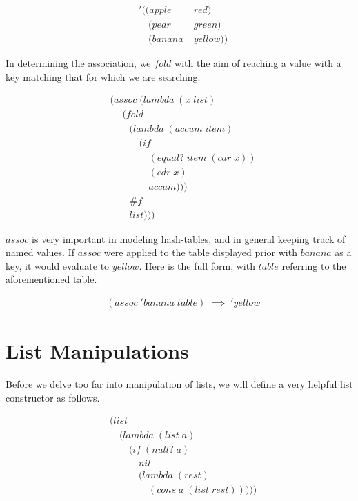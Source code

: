 \begin{figure}[htp]
\footnotesize
\caption{}\label{fig:hashExample}
\begin{align*}
& '((apple \; &red)
\\& \quad (pear \; &green)
\\& \quad (banana \; &yellow))
\end{align*}
\end{figure}

In determining the association, we $fold$ with the aim of reaching a value with a 
key matching that for which we are searching.

\begin{figure}[htp]
\footnotesize
\caption{}\label{fig:assocDef}
\begin{align*}
& (assoc \; (lambda \; (x \; list)
\\& \quad \; (fold \; 
\\& \qquad (lambda \; (accum \; item) \; 
\\& \qquad \quad (if \; 
\\& \qquad \qquad (equal? \; item \; (car \; x))
\\& \qquad \qquad (cdr \; x)
\\& \qquad \qquad accum)))
\\& \qquad \#f
\\& \qquad list)))
\end{align*}
\end{figure}

$assoc$ is very important in modeling hash-tables, and in general keeping track of 
named values. If $assoc$ were applied to the table displayed prior with $banana$ 
as a key, it would evaluate to $yellow$. Here is the full form, with $table$ 
referring to the aforementioned table.

\begin{figure}[htp]
\footnotesize
\caption{}\label{fig:assocExample}
\begin{align*}
& (assoc \; 'banana \; table) \; \implies \; 'yellow
\end{align*}
\end{figure}

\section{List Manipulations}
Before we delve too far into manipulation of lists, we will define a very helpful 
list constructor as follows.

\begin{figure}[htp]
\footnotesize
\caption{}\label{fig:listDef}
\begin{align*}
& (list \; 
\\& \quad (lambda \; (list \; a) \; 
\\& \qquad (if \; (null? \; a)
\\& \qquad \quad nil
\\& \qquad \quad (lambda \; (rest)
\\& \qquad \qquad (cons \; a \; (list \; rest)))))
\end{align*}
\end{figure}

